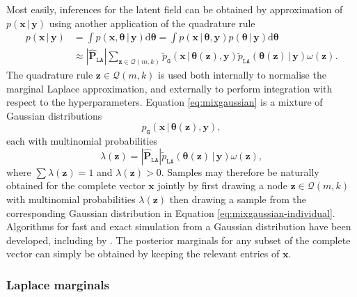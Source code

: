 \documentclass[a4paper, nobind]{templates/ociamthesis}
\begin{document}
Most easily, inferences for the latent field can be obtained by approximation of \(p(\mathbf{x} \, | \, \mathbf{y})\) using another application of the quadrature rule \autocite{rue2007approximate}
\begin{align}
p(\mathbf{x} \, | \, \mathbf{y}) &= \int p(\mathbf{x}, \boldsymbol{\mathbf{\theta}} \, | \, \mathbf{y}) \text{d} \boldsymbol{\mathbf{\theta}} = \int p(\mathbf{x} \, | \, \boldsymbol{\mathbf{\theta}}, \mathbf{y}) p(\boldsymbol{\mathbf{\theta}} \, | \, \mathbf{y}) \text{d} \boldsymbol{\mathbf{\theta}} \\
&\approx |\hat{\mathbf{P}}_\texttt{LA}| \sum_{\mathbf{z} \in \mathcal{Q}(m, k)} \tilde p_\texttt{G}(\mathbf{x} \, | \, \boldsymbol{\mathbf{\theta}}(\mathbf{z}), \mathbf{y}) \tilde p_\texttt{LA}(\boldsymbol{\mathbf{\theta}}(\mathbf{z}) \, | \, \mathbf{y}) \omega(\mathbf{z}). \label{eq:mixgaussian}
\end{align}
The quadrature rule \(\mathbf{z} \in \mathcal{Q}(m, k)\) is used both internally to normalise the marginal Laplace approximation, and externally to perform integration with respect to the hyperparameters.
Equation \eqref{eq:mixgaussian} is a mixture of Gaussian distributions
\begin{equation}
p_\texttt{G}(\mathbf{x} \, | \, \boldsymbol{\mathbf{\theta}}(\mathbf{z}), \mathbf{y}), \label{eq:mixgaussian-individual}
\end{equation}
each with multinomial probabilities
\begin{equation}
\lambda(\mathbf{z}) = |\hat{\mathbf{P}}_\texttt{LA}| \tilde p_\texttt{LA}(\boldsymbol{\mathbf{\theta}}(\mathbf{z}) \, | \, \mathbf{y}) \omega(\mathbf{z}),
\end{equation}
where \(\sum \lambda(\mathbf{z}) = 1\) and \(\lambda(\mathbf{z}) > 0\).
Samples may therefore be naturally obtained for the complete vector \(\mathbf{x}\) jointly by first drawing a node \(\mathbf{z} \in \mathcal{Q}(m, k)\) with multinomial probabilities \(\lambda(\mathbf{z})\) then drawing a sample from the corresponding Gaussian distribution in Equation \eqref{eq:mixgaussian-individual}.
Algorithms for fast and exact simulation from a Gaussian distribution have been developed, including by \textcite{rue2001fast}.
The posterior marginals for any subset of the complete vector can simply be obtained by keeping the relevant entries of \(\mathbf{x}\).

\hypertarget{laplace-marginals}{%
\subsubsection{Laplace marginals}\label{laplace-marginals}}
\end{document}

